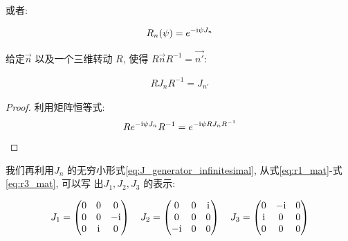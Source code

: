 或者:

\begin{equation}\label{eq:J_generator_exponential}
  \begin{aligned}
    R_{n}(\psi) = e^{- {\rm i} \psi J_{n}}
  \end{aligned}
\end{equation}

\begin{lemma}[ $J_{n}$ 的矢量性]
  给定$\vec{n}$ 以及一个三维转动 $R$, 使得
  $R \vec{n}R^{-1}=\vec{n'}$:

  \begin{equation}
    \begin{aligned}
      R J_{n} R^{-1} = J_{n'}
    \end{aligned}
  \end{equation}

\end{lemma}
\begin{proof}
  利用矩阵恒等式:
  \begin{equation}
    \begin{aligned}
      R e^{- {\rm i}\psi J_{n}}R^{-1} = e^{- {\rm i}\psi R J_{n} R^{-1}}
    \end{aligned}
  \end{equation}
\end{proof}

我们再利用$J_{n}$ 的无穷小形式\ref{eq:J_generator_infinitesimal},
从式\ref{eq:r1_mat}-式\ref{eq:r3_mat}, 可以写
出$J_1, J_{2}, J_3$ 的表示:

\begin{equation}
  \begin{aligned}
    J_1 =
    \begin{pmatrix}
      0 & 0 & 0 \\
      0 & 0 & - {\rm i} \\
      0 & {\rm i} & 0 \\
    \end{pmatrix}\quad
    J_2 =
    \begin{pmatrix}
      0 & 0 & {\rm i}\\
      0 & 0 & 0\\
      - {\rm i} & 0 & 0
    \end{pmatrix}\quad
    J_3 = 
    \begin{pmatrix}
      0 & - {\rm i} & 0\\
      {\rm i} & 0 & 0\\
      0 & 0 & 0
    \end{pmatrix}
  \end{aligned}
\end{equation}

